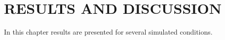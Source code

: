 %
%
%
%
%
%
%

\chapter{RESULTS AND DISCUSSION} \label{chap:results}
In this chapter results are presented for several simulated conditions.

